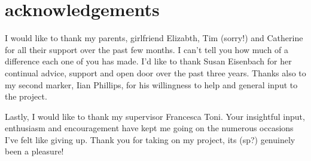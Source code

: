 \chapter*{acknowledgements}

I would like to thank my parents, girlfriend Elizabth, Tim (sorry!) and Catherine for all their support over the past few months. I can't tell you how much of a difference each one of you has made. I'd like to thank Susan Eisenbach for her continual advice, support and open door over the past three years. Thanks also to my second marker, Iian Phillips, for his willingness to help and general input to the project. 
	
Lastly, I would like to thank my supervisor Francesca Toni. Your insightful input, enthusiasm and encouragement have kept me going on the numerous occasions I've felt like giving up. Thank you for taking on my project, its (sp?) genuinely been a pleasure!
